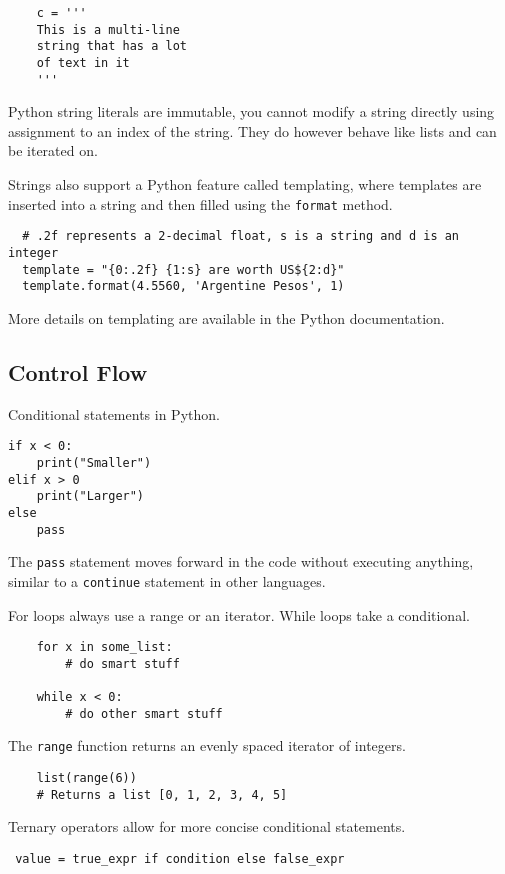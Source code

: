  \begin{verbatim}
	c = '''
	This is a multi-line
	string that has a lot
	of text in it
	'''
 \end{verbatim}

 Python string literals are immutable, you cannot modify a string directly using assignment to an index of the string. They do however behave like lists and can be iterated on.

 Strings also support a Python feature called templating, where templates are inserted into a string and then filled using the \texttt{format} method.

  \begin{verbatim}
  # .2f represents a 2-decimal float, s is a string and d is an integer
  template = "{0:.2f} {1:s} are worth US${2:d}"
  template.format(4.5560, 'Argentine Pesos', 1)
 \end{verbatim}

 More details on templating are available in the Python documentation.

 \subsection{Control Flow}

 Conditional statements in Python.

  \begin{verbatim}
if x < 0:
	print("Smaller")
elif x > 0
	print("Larger")
else
	pass
 \end{verbatim}

The \texttt{pass} statement moves forward in the code without executing anything, similar to a \texttt{continue} statement in other languages.

For loops always use a range or an iterator. While loops take a conditional.

 \begin{verbatim}
 	for x in some_list:
 		# do smart stuff

 	while x < 0:
 		# do other smart stuff
 	 \end{verbatim}

 The \texttt{range} function returns an evenly spaced iterator of integers.

 \begin{verbatim}
	list(range(6))
	# Returns a list [0, 1, 2, 3, 4, 5]
 \end{verbatim}

Ternary operators allow for more concise conditional statements.
 \begin{verbatim}
 value = true_expr if condition else false_expr
 \end{verbatim}



